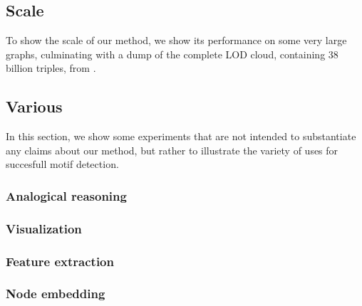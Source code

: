 \documentclass[11pt]{article}
\begin{document}
\subsection{Scale}

To show the scale of our method, we show its performance on some very large graphs, culminating with a dump of the complete LOD cloud, containing 38 billion triples, from \cite{}.

\subsection{Various}


In this section, we show some experiments that are not intended to substantiate any claims about our method, but rather to illustrate the variety of uses for succesfull motif detection. 

\subsubsection{Analogical reasoning}

\subsubsection{Visualization}

\subsubsection{Feature extraction}

\subsubsection{Node embedding}


\end{document}
